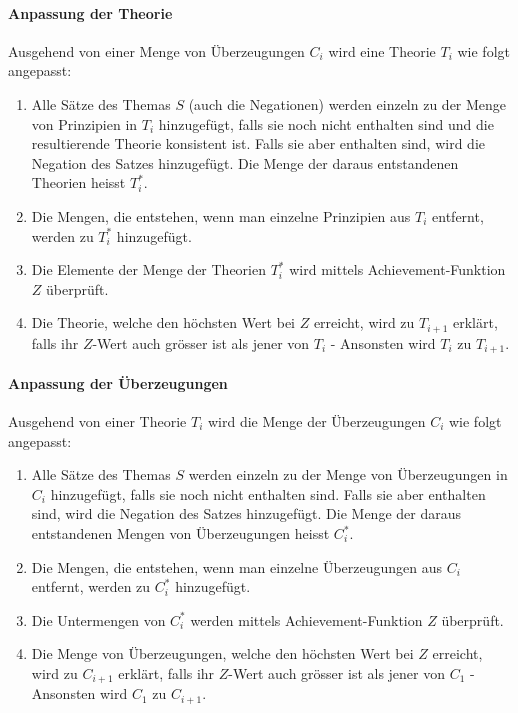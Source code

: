 \documentclass{article}
\begin{document}
\paragraph{Anpassung der Theorie}
Ausgehend von einer Menge von Überzeugungen $C_i$ wird eine Theorie $T_i$ wie folgt angepasst: 
\begin{enumerate}
    \item \label{1} Alle Sätze des Themas $S$ (auch die Negationen) werden einzeln zu der Menge von Prinzipien in $T_i$ hinzugefügt, falls sie noch nicht enthalten sind und die resultierende Theorie konsistent ist. Falls sie aber enthalten sind, wird die Negation des Satzes hinzugefügt. Die Menge der daraus entstandenen Theorien heisst $T_i^*$.
    \item \label{2}Die Mengen, die entstehen, wenn man einzelne Prinzipien aus $T_i$ entfernt, werden zu $T_i^*$ hinzugefügt.
    \item \label{3}Die Elemente der Menge der Theorien $T_i^*$ wird mittels Achievement-Funktion $Z$ überprüft.
    \item \label{4}Die Theorie, welche den höchsten Wert bei $Z$ erreicht, wird zu $T_{i+1}$ erklärt, falls ihr $Z$-Wert auch grösser ist als jener von $T_i$ - Ansonsten wird $T_i$ zu $T_{i+1}$.
\end{enumerate}

\paragraph{Anpassung der Überzeugungen}
Ausgehend von einer Theorie $T_i$ wird die Menge der Überzeugungen $C_i$ wie folgt angepasst:
\begin{enumerate}
    \item \label{c1} Alle Sätze des Themas $S$ werden einzeln zu der Menge von Überzeugungen in $C_i$ hinzugefügt, falls sie noch nicht enthalten sind. Falls sie aber enthalten sind, wird die Negation des Satzes hinzugefügt. Die Menge der daraus entstandenen Mengen von Überzeugungen heisst $C_i^*$.
    \item \label{c2} Die Mengen, die entstehen, wenn man einzelne Überzeugungen aus $C_i$ entfernt, werden zu $C_i^*$ hinzugefügt.
    \item \label{c3} Die Untermengen von $C_i^*$ werden mittels Achievement-Funktion $Z$ überprüft.
    \item \label{c4}Die Menge von Überzeugungen, welche den höchsten Wert bei $Z$ erreicht, wird zu $C_{i+1}$ erklärt, falls ihr $Z$-Wert auch grösser ist als jener von $C_1$ - Ansonsten wird $C_1$ zu $C_{i+1}$.
\end{enumerate}
\end{document}

